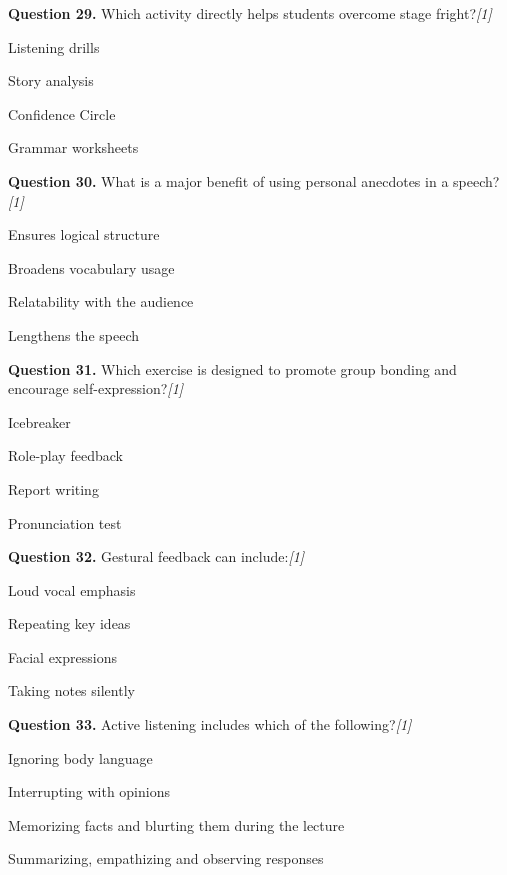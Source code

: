 \documentclass[11pt,a4paper]{article}
\newcommand{\pts}[1]{\hfill   \textit{[#1]}}
\begin{document}
\noindent   \textbf{Question 29.} Which activity directly helps students overcome stage fright?\pts{1}

\begin{parts}
  \item Listening drills
  \item Story analysis
  \item Confidence Circle
  \item Grammar worksheets
\end{parts}

\medskip


\noindent   \textbf{Question 30.} What is a major benefit of using personal anecdotes in a speech?\pts{1}

\begin{parts}
  \item Ensures logical structure
  \item Broadens vocabulary usage
  \item Relatability with the audience
  \item Lengthens the speech
\end{parts}

\medskip


\noindent   \textbf{Question 31.} Which exercise is designed to promote group bonding and encourage self-expression?\pts{1}

\begin{parts}
  \item Icebreaker
  \item Role-play feedback
  \item Report writing
  \item Pronunciation test
\end{parts}

\medskip


\noindent   \textbf{Question 32.} Gestural feedback can include:\pts{1}

\begin{parts}
  \item Loud vocal emphasis
  \item Repeating key ideas
  \item Facial expressions
  \item Taking notes silently
\end{parts}

\medskip


\noindent   \textbf{Question 33.} Active listening includes which of the following?\pts{1}

\begin{parts}
  \item Ignoring body language
  \item Interrupting with opinions
  \item Memorizing facts and blurting them during the lecture
  \item Summarizing, empathizing and observing responses
\end{parts}
\end{document}
